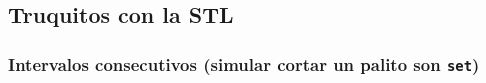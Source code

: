 \subsection{Truquitos con la STL}
    

    \subsubsection{Intervalos consecutivos (simular cortar un palito son \texttt{set})}
    
